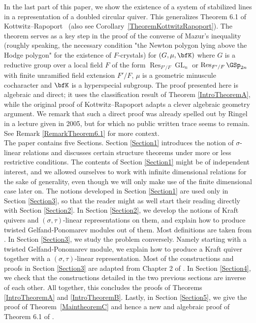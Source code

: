 \documentclass[12pt]{amsart}
\theoremstyle{definition}
\DeclareMathOperator{\Res}{Res}
\DeclareMathOperator{\GL}{GL}
\newcommand{\<}{\langle}   %
\renewcommand{\>}{\rangle} %
\begin{document}
In the last part of this paper, we show the existence of a system of stabilized lines in a representation of a doubled circular quiver. This generalizes Theorem 6.1 of Kottwitz--Rapoport~\cite{kottwitzrapoport:2003} (also see Corollary~\ref{TheoremKottwitzRapoport}). The theorem serves as a key step in the proof of the converse of Mazur's inequality (roughly speaking, the necessary condition "the Newton polygon lying above the Hodge polygon" for the existence of $F$-crystals) for $(G,\mu, {\bfK)}$ where $G$ is a reductive group over a local field $F$ of the form $\Res_{F'/F}\GL_n$ or $\Res_{F'/F}\GSp_{2n}$ with finite unramified field extension $F'/F$, $\mu$ is a geometric minuscule cocharacter and $\bfK$ is a hyperspecial  subgroup. The proof presented here is algebraic and direct; it uses the classification result of Theorem \ref{IntroTheoremA}, while the original proof of Kottwitz--Rapoport adapts a clever algebraic geometry argument.  
We remark that such a direct proof was already spelled out by Ringel \cite{ringellecture:2005} in a lecture given in 2005, but for which no public written trace seems to remain. See Remark \ref{RemarkTheorem6.1} for more context. \\

The paper contains five Sections. Section \ref{Section1} introduces the notion of $\sigma$-linear relations and discusses certain structure theorems under more or less restrictive conditions. The contents of Section \ref{Section1} might be of independent interest, and we allowed ourselves to work with infinite dimensional relations for the sake of generality, even though we will only make use of the finite dimensional case later on. The notions developed in Section \ref{Section1} are used only in Section \ref{Section3}, so that the reader might as well start their reading directly with Section \ref{Section2}. In Section \ref{Section2}, we develop the notions of Kraft quivers and $(\sigma,\tau)$-linear representations on them, and explain how to produce twisted Gelfand-Ponomarev modules out of them. Most definitions are taken from \cite{chai:kraft2025}. In Section \ref{Section3}, we study the problem conversely. Namely starting with a twisted Gelfand-Ponomarev module, we explain how to produce a Kraft quiver together with a $(\sigma,\tau)$-linear representation. Most of the constructions and proofs in Section \ref{Section3} are adapted from Chapter 2 of \cite{gelfand-ponomarev:1968}. In Section \ref{Section4}, we check that the constructions detailed in the two previous sections are inverse of each other. All together, this concludes the proofs of Theorems \ref{IntroTheoremA} and \ref{IntroTheoremB}. Lastly, in Section \ref{Section5}, we give the proof of Theorem~\ref{MaintheoremC} and hence a new and algebraic proof of Theorem 6.1 of \cite{kottwitzrapoport:2003}.
\end{document}
